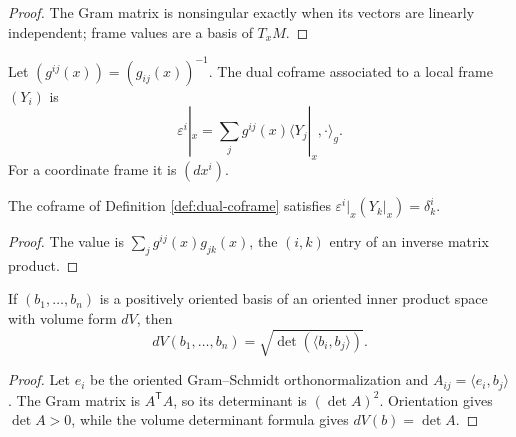 \begin{proof}

\sketch The Gram matrix is nonsingular exactly when its vectors are linearly independent; frame values are a basis of $T_xM$.
\end{proof}

\begin{definition}
\label{def:dual-coframe}





Let $(g^{ij}(x))=(g_{ij}(x))^{-1}$. The dual coframe associated to a local frame $(Y_i)$ is
\[
\varepsilon^i|_x=\sum_j g^{ij}(x)\langle Y_j|_x,\cdot\rangle_g.
\]
For a coordinate frame it is $(dx^i)$.
\end{definition}

\begin{lemma}
\label{lem:dual-coframe-duality}





The coframe of Definition \ref{def:dual-coframe} satisfies $\varepsilon^i|_x(Y_k|_x)=\delta^i_k$.
\end{lemma}

\begin{proof}

\sketch The value is $\sum_jg^{ij}(x)g_{jk}(x)$, the $(i,k)$ entry of an inverse matrix product.
\end{proof}

\begin{lemma}
\label{lem:volume-form-gram-determinant}





If $(b_1,\ldots,b_n)$ is a positively oriented basis of an oriented inner product space with volume form $dV$, then
\[
dV(b_1,\ldots,b_n)=\sqrt{\det(\langle b_i,b_j\rangle)}.
\]
\end{lemma}

\begin{proof}

\sketch Let $e_i$ be the oriented Gram--Schmidt orthonormalization and $A_{ij}=\langle e_i,b_j\rangle$. The Gram matrix is $A^{\mathsf T}A$, so its determinant is $(\det A)^2$. Orientation gives $\det A>0$, while the volume determinant formula gives $dV(b)=\det A$.
\end{proof}

